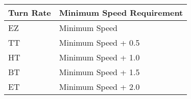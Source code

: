 \begin{onecolumntablefloat}
\begin{onecolumntable}
\begin{tabular}{ll}
\toprule
Turn Rate&Minimum Speed Requirement\\
\midrule
 EZ& Minimum Speed\\
 TT& Minimum Speed + 0.5\\
 HT& Minimum Speed + 1.0\\
 BT& Minimum Speed + 1.5\\ 
 ET& Minimum Speed + 2.0\\
\bottomrule
\end{tabular}
\end{onecolumntable}
\end{onecolumntablefloat}
